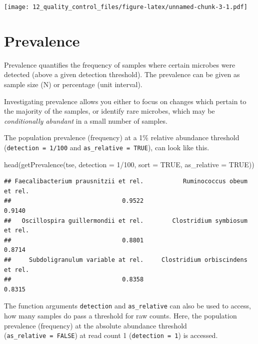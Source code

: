 \documentclass[
]{book}
\newenvironment{Shaded}{\begin{snugshade}}{\end{snugshade}}
\newcommand{\AttributeTok}[1]{\textcolor[rgb]{0.77,0.63,0.00}{#1}}
\newcommand{\ConstantTok}[1]{\textcolor[rgb]{0.00,0.00,0.00}{#1}}
\newcommand{\DecValTok}[1]{\textcolor[rgb]{0.00,0.00,0.81}{#1}}
\newcommand{\FunctionTok}[1]{\textcolor[rgb]{0.00,0.00,0.00}{#1}}
\newcommand{\NormalTok}[1]{#1}
\newcommand{\SpecialCharTok}[1]{\textcolor[rgb]{0.00,0.00,0.00}{#1}}
\begin{document}
\texttt{[image: 12\_quality\_control\_files/figure-latex/unnamed-chunk-3-1.pdf]}

\hypertarget{prevalence}{%
\section{Prevalence}\label{prevalence}}

Prevalence quantifies the frequency of samples where certain microbes
were detected (above a given detection threshold). The prevalence can
be given as sample size (N) or percentage (unit interval).

Investigating prevalence allows you either to focus on changes which
pertain to the majority of the samples, or identify rare microbes,
which may be \emph{conditionally abundant} in a small number of samples.

The population prevalence (frequency) at a 1\% relative abundance
threshold (\texttt{detection\ =\ 1/100} and \texttt{as\_relative\ =\ TRUE}), can look
like this.

\begin{Shaded}
\begin{Highlighting}[]
\FunctionTok{head}\NormalTok{(}\FunctionTok{getPrevalence}\NormalTok{(tse, }\AttributeTok{detection =} \DecValTok{1}\SpecialCharTok{/}\DecValTok{100}\NormalTok{, }\AttributeTok{sort =} \ConstantTok{TRUE}\NormalTok{, }\AttributeTok{as\_relative =} \ConstantTok{TRUE}\NormalTok{))}
\end{Highlighting}
\end{Shaded}

\begin{verbatim}
## Faecalibacterium prausnitzii et rel.           Ruminococcus obeum et rel. 
##                               0.9522                               0.9140 
##   Oscillospira guillermondii et rel.        Clostridium symbiosum et rel. 
##                               0.8801                               0.8714 
##     Subdoligranulum variable at rel.     Clostridium orbiscindens et rel. 
##                               0.8358                               0.8315
\end{verbatim}

The function arguments \texttt{detection} and \texttt{as\_relative} can also be used
to access, how many samples do pass a threshold for raw counts. Here,
the population prevalence (frequency) at the absolute abundance
threshold (\texttt{as\_relative\ =\ FALSE}) at read count 1 (\texttt{detection\ =\ 1}) is
accessed.
\end{document}
